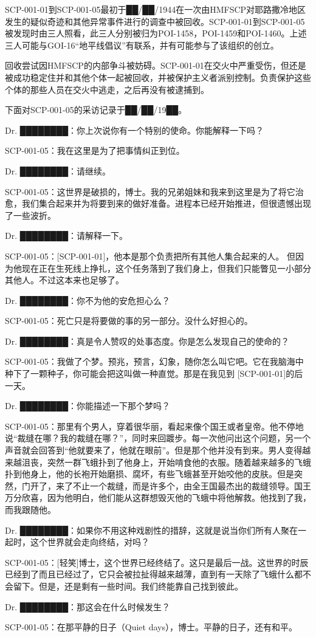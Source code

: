 SCP-001-01到SCP-001-05最初于██\slash ██\slash 1944在一次由HMFSCP对耶路撒冷地区发生的疑似奇迹和其他异常事件进行的调查中被回收。SCP-001-01到SCP-001-05被发现时由三人照看，此三人分别被归为POI-1458，POI-1459和POI-1460。上述三人可能与GOI-16“地平线倡议”有联系，并有可能参与了该组织的创立。

回收尝试因HMFSCP的内部争斗被妨碍。SCP-001-01在交火中严重受伤，但还是被成功稳定住并和其他个体一起被回收，并被保护主义者派别控制。负责保护这些个体的那些人员在交火中逃走，之后再没有被逮捕到。


下面对SCP-001-05的采访记录于██\slash ██\slash 19██。

\begin{scpbox}

Dr. ████████：你上次说你有一个特别的使命。你能解释一下吗？

SCP-001-05：我在这里是为了把事情纠正到位。

Dr. ████████：请继续。

SCP-001-05：这世界是破损的，博士。我的兄弟姐妹和我来到这里是为了将它治愈，我们集合起来并为将要到来的做好准备。进程本已经开始推进，但很遗憾出现了一些波折。

Dr. ████████：请解释一下。

SCP-001-05：{[}SCP-001-01]，他本是那个负责把所有其他人集合起来的人。 但因为他现在正在生死线上挣扎，这个任务落到了我们身上，但我们只能瞥见一小部分其他人。不过这本来也足够了。

Dr. ████████：你不为他的安危担心么？

SCP-001-05：死亡只是将要做的事的另一部分。没什么好担心的。

Dr. ████████：真是令人赞叹的处事态度。你是怎么发现自己的使命的？

SCP-001-05：我做了个梦。预兆，预言，幻象，随你怎么叫它吧。它在我脑海中种下了一颗种子，你可能会把这叫做一种直觉。那是在我见到 {[}SCP-001-01]的后一天。

Dr. ████████：你能描述一下那个梦吗？

SCP-001-05：那里有个男人，穿着很华丽，看起来像个国王或者皇帝。他不停地说“裁缝在哪？我的裁缝在哪？”，同时来回踱步。每一次他问出这个问题，另一个声音就会回答到“他就要来了，他就在眼前”。但是那个他并没有到来。男人变得越来越沮丧，突然一群飞蛾扑到了他身上，开始啃食他的衣服。随着越来越多的飞蛾扑到他身上，他的长袍开始磨损、腐坏，有些飞蛾甚至开始咬他的皮肤。但是突然，门开了，来了不止一个裁缝，而是许多个，由全王国最杰出的裁缝领导。国王万分欣喜，因为他明白，他们能从这群想毁灭他的飞蛾中将他解救。他找到了我，而我跟随他。

Dr. ████████：如果你不用这种戏剧性的措辞，这就是说当你们所有人聚在一起时，这个世界就会走向终结，对吗？

SCP-001-05：{[}轻笑]博士，这个世界已经终结了。这只是最后一战。这世界的时辰已经到了而且已经过了，它只会被拉扯得越来越薄，直到有一天除了飞蛾什么都不会留下。但是，还是剩有一些时间。我们终能靠自己找到彼此。

Dr. ████████：那这会在什么时候发生？

SCP-001-05：在那平静的日子（Quiet days），博士。平静的日子，还有和平。

\end{scpbox}

